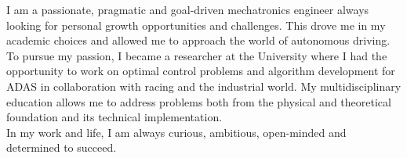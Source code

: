 \documentclass[9pt]{developercv_mattia} %
\begin{document}
\begin{minipage}[t]{0.54\textwidth} %
	
%
I am a passionate, pragmatic and goal-driven mechatronics engineer always looking for personal growth opportunities and challenges. This drove me in my academic choices and allowed me to approach the world of autonomous driving.
To pursue my passion, I became a researcher at the University where I had the opportunity to work on optimal control problems and algorithm development for ADAS in collaboration with racing and the industrial world.
My multidisciplinary education allows me to address problems both from the physical and theoretical foundation and its technical implementation. \\
In my work and life, I am always curious, ambitious, open-minded and determined to succeed.



%
\end{minipage}
\hfill %
\begin{minipage}[t]{0.45\textwidth} %
	\begin{barchart}{5.5}
	\end{barchart}
\end{minipage}
%
%
%
\end{document}
